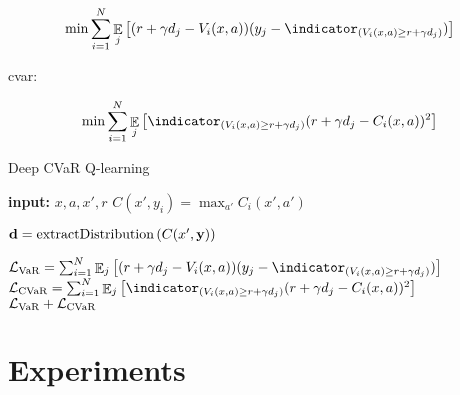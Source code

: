 \begin{equation}
\min \sum_{i=1}^{N} \expect_j\bsquare{(r + \gamma d_j - V_i(x, a))(y_j - \indicator_{(V_i(x, a) \ge r + \gamma d_j)})}
\end{equation}


cvar:

\begin{equation}
\min \sum_{i=1}^{N} \expect_j\bsquare{\indicator_{(V_i(x, a) \ge r + \gamma d_j)}(r + \gamma d_j - C_i(x, a))^2}
\end{equation}


\begin{algorithm}
\caption{Deep CVaR Q-learning}
\begin{algorithmic}\label{alg:cvardqn}

    \STATE \textbf{input:} $x, a, x', r$
    \bindent
	\STATE $C(x', y_i) = \max_{a'} C_i(x', a')$
	\ENDFOR
	
	\STATE $\mathbf{d}= \text{extractDistribution}\left( {C(x', \mathbf{y})} \right)$

	
	\STATE $\mathcal{L}_{\var}=\sum_{i=1}^{N} \expect_j\bsquare{(r + \gamma d_j - V_i(x, a))(y_j - \indicator_{(V_i(x, a) \ge r + \gamma d_j)})}$
	\STATE $\mathcal{L}_{\cvar}=\sum_{i=1}^{N} \expect_j\bsquare{\indicator_{(V_i(x, a) \ge r + \gamma d_j)}(r + \gamma d_j - C_i(x, a))^2}$
	\eindent
	\RETURN $\mathcal{L}_{\text{VaR}} + \mathcal{L}_{\text{CVaR}}$
	
\end{algorithmic}
\end{algorithm}




\section{Experiments}

